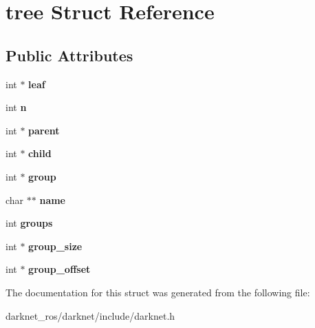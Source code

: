 \hypertarget{structtree}{}\section{tree Struct Reference}
\label{structtree}
\subsection*{Public Attributes}
\begin{DoxyCompactItemize}
\item 
\mbox{\label{structtree_a08371bc037edecea4f1632c2185b1ff1}} 
int $\ast$ {\bfseries leaf}
\item 
\mbox{\label{structtree_a2273fc7497601bfaf9121d1a797453b5}} 
int {\bfseries n}
\item 
\mbox{\label{structtree_a77b1eb5cb07b504420034ed006f75cb5}} 
int $\ast$ {\bfseries parent}
\item 
\mbox{\label{structtree_ac33525f8c2ea9df09aa39e4e5f0f46b0}} 
int $\ast$ {\bfseries child}
\item 
\mbox{\label{structtree_a3accabb15b1b96d0f81e40341e55cc20}} 
int $\ast$ {\bfseries group}
\item 
\mbox{\label{structtree_aef62d17752842a143625d7313073c068}} 
char $\ast$$\ast$ {\bfseries name}
\item 
\mbox{\label{structtree_ab4d92fc866330ea5e427d6b5b8075604}} 
int {\bfseries groups}
\item 
\mbox{\label{structtree_a4b84be443f42bcf6cc16fd9d3fa1f326}} 
int $\ast$ {\bfseries group\+\_\+size}
\item 
\mbox{\label{structtree_a349dec53fea0efa2e19de49785a2f0ff}} 
int $\ast$ {\bfseries group\+\_\+offset}
\end{DoxyCompactItemize}


The documentation for this struct was generated from the following file\+:\begin{DoxyCompactItemize}
\item 
darknet\+\_\+ros/darknet/include/darknet.\+h\end{DoxyCompactItemize}
